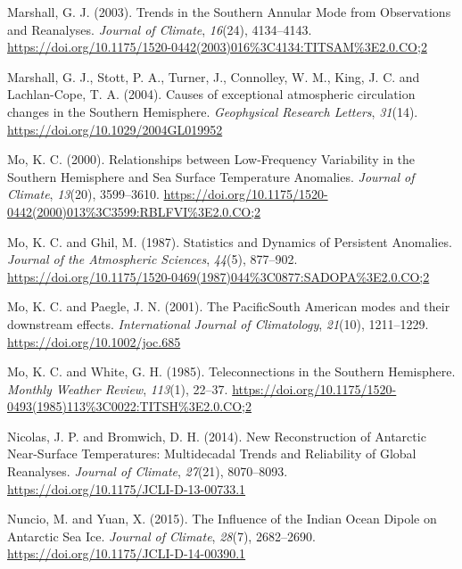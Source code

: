\documentclass[12pt,oneside,a4paper]{reedthesis}
\newlength{\cslhangindent}
\newenvironment{CSLReferences}[2] %
 {%
  \setlength{\parindent}{0pt}
  \ifodd #1 \everypar{\setlength{\hangindent}{\cslhangindent}}\ignorespaces\fi
  \ifnum #2 > 0
  \setlength{\parskip}{#2\baselineskip}
  \fi
 }%
 {}
\begin{document}
\begin{CSLReferences}{1}{0}
\leavevmode{}%
Marshall, G. J. (2003). Trends in the {Southern Annular Mode} from {Observations} and {Reanalyses}. \emph{Journal of Climate}, \emph{16}(24), 4134--4143. \url{https://doi.org/10.1175/1520-0442(2003)016\%3C4134:TITSAM\%3E2.0.CO;2}

\leavevmode{}%
Marshall, G. J., Stott, P. A., Turner, J., Connolley, W. M., King, J. C. and Lachlan-Cope, T. A. (2004). Causes of exceptional atmospheric circulation changes in the {Southern Hemisphere}. \emph{Geophysical Research Letters}, \emph{31}(14). \url{https://doi.org/10.1029/2004GL019952}

\leavevmode{}%
Mo, K. C. (2000). Relationships between {Low-Frequency Variability} in the {Southern Hemisphere} and {Sea Surface Temperature Anomalies}. \emph{Journal of Climate}, \emph{13}(20), 3599--3610. \url{https://doi.org/10.1175/1520-0442(2000)013\%3C3599:RBLFVI\%3E2.0.CO;2}

\leavevmode{}%
Mo, K. C. and Ghil, M. (1987). Statistics and {Dynamics} of {Persistent Anomalies}. \emph{Journal of the Atmospheric Sciences}, \emph{44}(5), 877--902. \url{https://doi.org/10.1175/1520-0469(1987)044\%3C0877:SADOPA\%3E2.0.CO;2}

\leavevmode{}%
Mo, K. C. and Paegle, J. N. (2001). The {Pacific}{\textendash}{South American} modes and their downstream effects. \emph{International Journal of Climatology}, \emph{21}(10), 1211--1229. \url{https://doi.org/10.1002/joc.685}

\leavevmode{}%
Mo, K. C. and White, G. H. (1985). Teleconnections in the {Southern Hemisphere}. \emph{Monthly Weather Review}, \emph{113}(1), 22--37. \url{https://doi.org/10.1175/1520-0493(1985)113\%3C0022:TITSH\%3E2.0.CO;2}

\leavevmode{}%
Nicolas, J. P. and Bromwich, D. H. (2014). New {Reconstruction} of {Antarctic Near-Surface Temperatures}: {Multidecadal Trends} and {Reliability} of {Global Reanalyses}. \emph{Journal of Climate}, \emph{27}(21), 8070--8093. \url{https://doi.org/10.1175/JCLI-D-13-00733.1}

\leavevmode{}%
Nuncio, M. and Yuan, X. (2015). The {Influence} of the {Indian Ocean Dipole} on {Antarctic Sea Ice}. \emph{Journal of Climate}, \emph{28}(7), 2682--2690. \url{https://doi.org/10.1175/JCLI-D-14-00390.1}


\end{CSLReferences}
\end{document}
